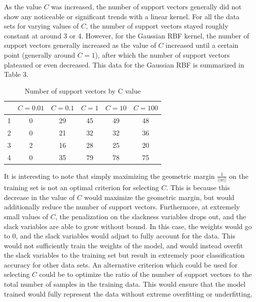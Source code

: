 \documentclass{article}
\begin{document}
As the value $C$ was increased, the number of support vectors generally did not show any noticeable or significant trends with a linear kernel. For all the data sets for varying values of $C$, the number of support vectors stayed roughly constant at around 3 or 4. However, for the Gaussian RBF kernel, the number of support vectors generally increased as the value of $C$ increased until a certain point (generally around $C=1$), after which the number of support vectors plateaued or even decreased. This data for the Gaussian RBF is summarized in Table 3. \\

\begin{table}
  \begin{center}
    \begin{tabular}{ | c | c | c | c | c | c | }
      \hline
              & $C=0.01$ & $C=0.1$ & $C=1$ & $C=10$ & $C=100$ \\ \hline
      1       & 0        & 29      & 45    & 49     & 48      \\ \hline
      2       & 0        & 21      & 32    & 32     & 36      \\ \hline
      3       & 2        & 16      & 28    & 25     & 20      \\ \hline
      4       & 0        & 35      & 79    & 78     & 75      \\ \hline
    \end{tabular}
  \end{center}
  \caption{Number of support vectors by C value}
\end{table}

It is interesting to note that simply maximizing the geometric margin $\frac{1}{||w||}$ on the training set is not an optimal criterion for selecting $C$. This is because this decrease in the value of $C$ would maximize the geometric margin, but would additionally reduce the number of support vectors. Furthermore, at extremely small values of $C$, the penalization on the slackness variables drops out, and the slack variables are able to grow without bound. In this case, the weights would go to 0, and the slack variables would adjust to fully account for the data. This would not sufficiently train the weights of the model, and would instead overfit the slack variables to the training set but result in extremely poor classification accuracy for other data sets. An alternative criterion which could be used for selecting $C$ could be to optimize the ratio of the number of support vectors to the total number of samples in the training data. This would ensure that the model trained would fully represent the data without extreme overfitting or underfitting.
\end{document}
